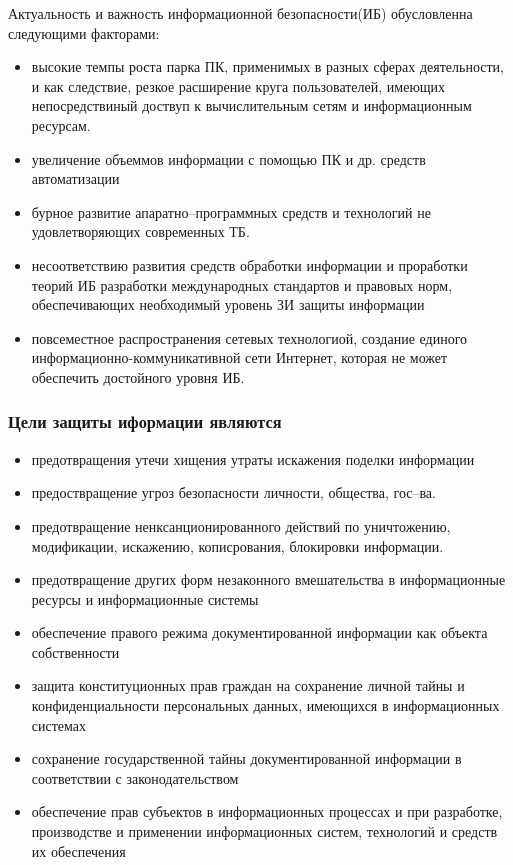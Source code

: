 \documentclass[a4paper,12pt]{extarticle}
\begin{document}
	Актуальность и важность информационной безопасности(ИБ) обусловленна следующими факторами:
	\begin{itemize}
		\item высокие темпы роста парка ПК, применимых в разных сферах деятельности, и как следствие, резкое расширение круга пользователей, имеющих непосредствиный доствуп к вычислительным сетям и информационным ресурсам.
		\item увеличение объеммов информации с помощью ПК и др. средств автоматизации
		\item бурное развитие апаратно--программных средств и технологий не удовлетворяющих современных ТБ.
		\item несоответствию развития средств обработки информации и проработки теорий ИБ разработки международных стандартов и правовых норм, обеспечивающих необходимый уровень ЗИ защиты информации
		\item  повсеместное распространения сетевых технологиой, создание единого информационно-коммуникативной сети Интернет, которая не может обеспечить достойного уровня ИБ.
	\end{itemize}

	\subsubsection*{Цели защиты иформации являются}
	\begin{itemize}
		\item предотвращения утечи хищения утраты искажения поделки информации
		\item  предоствращение угроз безопасности личности, общества, гос--ва.
		\item предотвращение ненксанционированного действий по уничтожению, модификации, искажению, кописрования, блокировки информации.
		\item  предотвращение других форм незаконного вмешательства в информационные ресурсы и информационные системы
		\item  обеспечение правого режима документированной информации как объекта собственности
		\item защита конституционных прав граждан на сохранение личной тайны и конфиденциальности персональных данных, имеющихся в информационных системах
		\item сохранение государственной тайны документированной информации в соответствии с законодательством
		\item обеспечение прав субъектов в информационных процессах и при разработке, производстве и применении информационных систем, технологий и средств их обеспечения
	\end{itemize}
\end{document}
